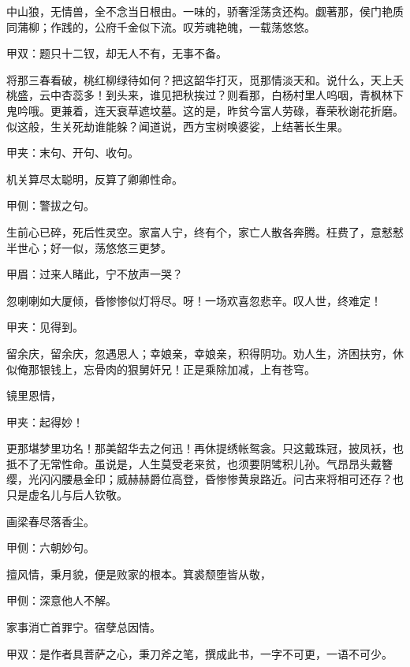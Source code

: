 \begin{qute}
    中山狼，无情兽，全不念当日根由。一味的，骄奢淫荡贪还构。觑著那，侯门艳质同蒲柳；作践的，公府千金似下流。叹芳魂艳魄，一载荡悠悠。\begin{note}甲双：题只十二钗，却无人不有，无事不备。\end{note}
\end{qute}
\begin{qute}
    将那三春看破，桃红柳绿待如何？把这韶华打灭，觅那情淡天和。说什么，天上夭桃盛，云中杏蕊多！到头来，谁见把秋挨过？则看那，白杨村里人呜咽，青枫林下鬼吟哦。更兼着，连天衰草遮坟墓。这的是，昨贫今富人劳碌，春荣秋谢花折磨。似这般，生关死劫谁能躲？闻道说，西方宝树唤婆娑，上结著长生果。\begin{note}甲夹：末句、开句、收句。\end{note}
\end{qute}
\begin{qute}
    机关算尽太聪明，反算了卿卿性命。\begin{note}甲侧：警拔之句。\end{note}生前心已碎，死后性灵空。家富人宁，终有个，家亡人散各奔腾。枉费了，意慭慭半世心；好一似，荡悠悠三更梦。\begin{note}甲眉：过来人睹此，宁不放声一哭？\end{note}忽喇喇如大厦倾，昏惨惨似灯将尽。呀！一场欢喜忽悲辛。叹人世，终难定！\begin{note}甲夹：见得到。\end{note}
\end{qute}
\begin{qute}
    留余庆，留余庆，忽遇恩人；幸娘亲，幸娘亲，积得阴功。劝人生，济困扶穷，休似俺那银钱上，忘骨肉的狠舅奸兄！正是乘除加减，上有苍穹。
\end{qute}
\begin{qute}
    镜里恩情，\begin{note}甲夹：起得妙！\end{note}更那堪梦里功名！那美韶华去之何迅！再休提绣帐鸳衾。只这戴珠冠，披凤袄，也抵不了无常性命。虽说是，人生莫受老来贫，也须要阴骘积儿孙。气昂昂头戴簪缨，光闪闪腰悬金印；威赫赫爵位高登，昏惨惨黄泉路近。问古来将相可还存？也只是虚名儿与后人钦敬。
\end{qute}
\begin{qute}
    画梁春尽落香尘。\begin{note}甲侧：六朝妙句。\end{note}擅风情，秉月貌，便是败家的根本。箕裘颓堕皆从敬，\begin{note}甲侧：深意他人不解。\end{note}家事消亡首罪宁。宿孽总因情。\begin{note}甲双：是作者具菩萨之心，秉刀斧之笔，撰成此书，一字不可更，一语不可少。\end{note}
\end{qute}
